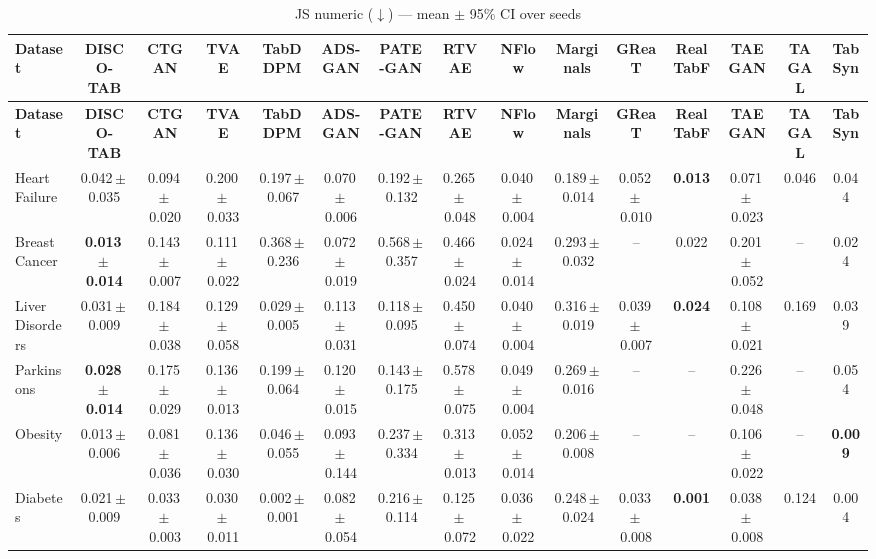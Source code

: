 \documentclass[8pt]{extarticle}
\begin{document}
\begin{longtable}{l*{14}{c}}
\caption{JS numeric ($\downarrow$) --- mean $\pm$ 95\% CI over seeds}\\
\toprule
\textbf{Dataset} & \textbf{DISCO-TAB} & \textbf{CTGAN} & \textbf{TVAE} & \textbf{TabDDPM} & \textbf{ADS-GAN} & \textbf{PATE-GAN} & \textbf{RTVAE} & \textbf{NFlow} & \textbf{Marginals} & \textbf{GReaT} & \textbf{RealTabF} & \textbf{TAEGAN} & \textbf{TAGAL} & \textbf{TabSyn} \\
\midrule
\endfirsthead
\toprule
\textbf{Dataset} & \textbf{DISCO-TAB} & \textbf{CTGAN} & \textbf{TVAE} & \textbf{TabDDPM} & \textbf{ADS-GAN} & \textbf{PATE-GAN} & \textbf{RTVAE} & \textbf{NFlow} & \textbf{Marginals} & \textbf{GReaT} & \textbf{RealTabF} & \textbf{TAEGAN} & \textbf{TAGAL} & \textbf{TabSyn} \\
\midrule
\endhead
\bottomrule
\endfoot
Heart Failure & 0.042\,$\pm$\,0.035 & 0.094\,$\pm$\,0.020 & 0.200\,$\pm$\,0.033 & 0.197\,$\pm$\,0.067 & 0.070\,$\pm$\,0.006 & 0.192\,$\pm$\,0.132 & 0.265\,$\pm$\,0.048 & 0.040\,$\pm$\,0.004 & 0.189\,$\pm$\,0.014 & 0.052\,$\pm$\,0.010 & \textbf{0.013} & 0.071\,$\pm$\,0.023 & 0.046 & 0.044 \\
Breast Cancer & \textbf{0.013\,$\pm$\,0.014} & 0.143\,$\pm$\,0.007 & 0.111\,$\pm$\,0.022 & 0.368\,$\pm$\,0.236 & 0.072\,$\pm$\,0.019 & 0.568\,$\pm$\,0.357 & 0.466\,$\pm$\,0.024 & 0.024\,$\pm$\,0.014 & 0.293\,$\pm$\,0.032 & -- & 0.022 & 0.201\,$\pm$\,0.052 & -- & 0.024 \\
Liver Disorders & 0.031\,$\pm$\,0.009 & 0.184\,$\pm$\,0.038 & 0.129\,$\pm$\,0.058 & 0.029\,$\pm$\,0.005 & 0.113\,$\pm$\,0.031 & 0.118\,$\pm$\,0.095 & 0.450\,$\pm$\,0.074 & 0.040\,$\pm$\,0.004 & 0.316\,$\pm$\,0.019 & 0.039\,$\pm$\,0.007 & \textbf{0.024} & 0.108\,$\pm$\,0.021 & 0.169 & 0.039 \\
Parkinsons & \textbf{0.028\,$\pm$\,0.014} & 0.175\,$\pm$\,0.029 & 0.136\,$\pm$\,0.013 & 0.199\,$\pm$\,0.064 & 0.120\,$\pm$\,0.015 & 0.143\,$\pm$\,0.175 & 0.578\,$\pm$\,0.075 & 0.049\,$\pm$\,0.004 & 0.269\,$\pm$\,0.016 & -- & -- & 0.226\,$\pm$\,0.048 & -- & 0.054 \\
Obesity & 0.013\,$\pm$\,0.006 & 0.081\,$\pm$\,0.036 & 0.136\,$\pm$\,0.030 & 0.046\,$\pm$\,0.055 & 0.093\,$\pm$\,0.144 & 0.237\,$\pm$\,0.334 & 0.313\,$\pm$\,0.013 & 0.052\,$\pm$\,0.014 & 0.206\,$\pm$\,0.008 & -- & -- & 0.106\,$\pm$\,0.022 & -- & \textbf{0.009} \\
Diabetes & 0.021\,$\pm$\,0.009 & 0.033\,$\pm$\,0.003 & 0.030\,$\pm$\,0.011 & 0.002\,$\pm$\,0.001 & 0.082\,$\pm$\,0.054 & 0.216\,$\pm$\,0.114 & 0.125\,$\pm$\,0.072 & 0.036\,$\pm$\,0.022 & 0.248\,$\pm$\,0.024 & 0.033\,$\pm$\,0.008 & \textbf{0.001} & 0.038\,$\pm$\,0.008 & 0.124 & 0.004 \\

\end{longtable}
\end{document}
